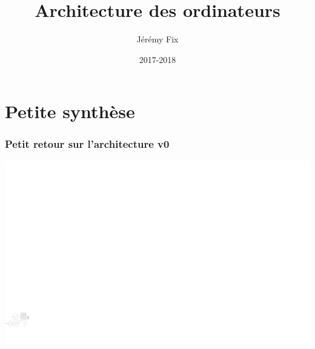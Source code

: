 \documentclass{beamer}
\title[Architecture]{Architecture des ordinateurs} %
\author{Jérémy Fix} %
\institute[CS] %
{
CentraleSupélec \\ %
\medskip
\textit{jeremy.fix@centralesupelec.fr} %
}
\date{2017-2018} %
\begin{document}
\begin{frame}
\titlepage %
\end{frame}





\section{Petite synthèse}

\begin{frame}
\begin{center}
\frametitle{Petit retour sur l'architecture v0}
\centering\includegraphics[width=\linewidth]{Figs/premier_chemin_seq_jmp.pdf}
\end{center}
\end{frame}
\end{document}
